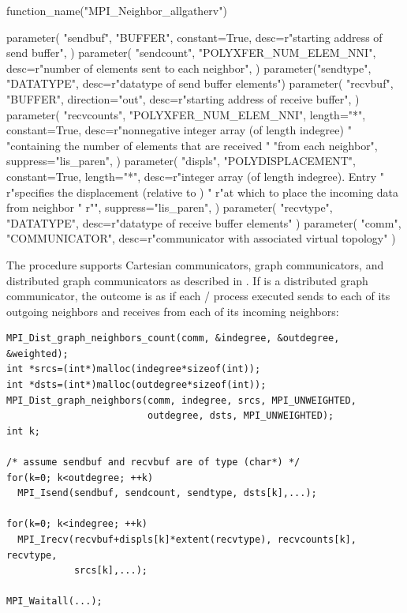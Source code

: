 \begin{mpi-binding}
    function_name("MPI_Neighbor_allgatherv")
    
    parameter(
        "sendbuf",
        "BUFFER",
        constant=True,
        desc=r"starting address of send buffer",
    )
    parameter(
        "sendcount",
        "POLYXFER_NUM_ELEM_NNI",
        desc=r"number of elements sent to each neighbor",
    )
    parameter("sendtype", "DATATYPE", desc=r"datatype of send buffer elements")
    parameter(
        "recvbuf",
        "BUFFER",
        direction="out",
        desc=r"starting address of receive buffer",
    )
    parameter(
        "recvcounts",
        "POLYXFER_NUM_ELEM_NNI",
        length="*",
        constant=True,
        desc=r"nonnegative integer array (of length indegree) "
        "containing the number of elements that are received "
        "from each neighbor",
        suppress="lis_paren",
    )
    parameter(
        "displs",
        "POLYDISPLACEMENT",
        constant=True,
        length="*",
        desc=r"integer array (of length indegree). Entry  "
        r"specifies the displacement (relative to ) "
        r"at which to place the incoming data from neighbor "
        r"",
        suppress="lis_paren",
    )
    parameter(
        "recvtype", "DATATYPE", desc=r"datatype of receive buffer elements"
    )
    parameter(
        "comm", "COMMUNICATOR", desc=r"communicator with associated virtual topology"
    )
\end{mpi-binding}

The  procedure supports Cartesian communicators, graph communicators, and
distributed graph communicators as described
in .
If  is a distributed graph communicator, the outcome is as if each
\MPI/ process executed sends to each of its outgoing neighbors and receives from
each of its incoming neighbors:

\begin{lstlisting}[language={[MPI]C}]
MPI_Dist_graph_neighbors_count(comm, &indegree, &outdegree, &weighted);
int *srcs=(int*)malloc(indegree*sizeof(int));
int *dsts=(int*)malloc(outdegree*sizeof(int));
MPI_Dist_graph_neighbors(comm, indegree, srcs, MPI_UNWEIGHTED,
                         outdegree, dsts, MPI_UNWEIGHTED);
int k;

/* assume sendbuf and recvbuf are of type (char*) */
for(k=0; k<outdegree; ++k) 
  MPI_Isend(sendbuf, sendcount, sendtype, dsts[k],...); 

for(k=0; k<indegree; ++k) 
  MPI_Irecv(recvbuf+displs[k]*extent(recvtype), recvcounts[k], recvtype,
            srcs[k],...); 

MPI_Waitall(...);
\end{lstlisting}

